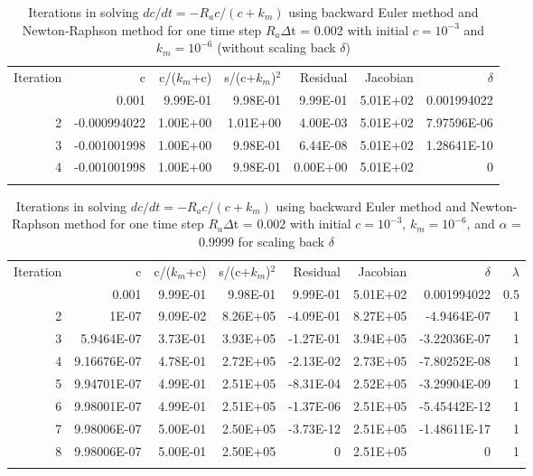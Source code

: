 \documentclass[gmd, manuscript]{copernicus}
\begin{document}
\begin{table}[t]
\caption{Iterations in solving $dc/dt=-R_ac/(c+k_m)$ using backward Euler method
and Newton-Raphson method for one time step $R_a\Delta$t = 0.002 with
initial $c=10^{-3}$ and $k_m=10^{-6}$ (without scaling back $\delta$)}
\label{table2}
\begin{tabular}{rrrrrrr}
\tophline
Iteration& c &	c/($k_m$+c)& s/(c+$k_m$)$^2$ & Residual	& Jacobian & $\delta$ \\
\middlehline
1 & 0.001 & 9.99E-01 & 9.98E-01 & 9.99E-01 & 5.01E+02 & 0.001994022  \\
2 & -0.000994022 & 1.00E+00 & 1.01E+00 & 4.00E-03 & 5.01E+02 & 7.97596E-06  \\
3 & -0.001001998 & 1.00E+00 & 9.98E-01 & 6.44E-08 & 5.01E+02 & 1.28641E-10  \\
4 & -0.001001998 & 1.00E+00 & 9.98E-01 & 0.00E+00 & 5.01E+02 & 0  \\
\bottomhline
\end{tabular}
\end{table}

\begin{table}[t]
\caption{Iterations in solving $dc/dt=-R_ac/(c+k_m)$ using backward Euler method
and Newton-Raphson method for one time step $R_a\Delta$t = 0.002 with
initial $c=10^{-3}$, $k_m=10^{-6}$, and $\alpha$ = 0.9999 for scaling back $\delta$}
\label{table3}
\begin{tabular}{rrrrrrrr}
\tophline
Iteration& c &	c/($k_m$+c)& s/(c+$k_m$)$^2$ & Residual	& Jacobian & $\delta$ & $\lambda$ \\
\middlehline
1 & 0.001 & 9.99E-01 & 9.98E-01 & 9.99E-01 & 5.01E+02 &	0.001994022 & 0.5 \\
2 & 1E-07 & 9.09E-02 & 8.26E+05 & -4.09E-01 & 8.27E+05 	& -4.9464E-07 &	1 \\
3 & 5.9464E-07 & 3.73E-01 & 3.93E+05 &	-1.27E-01 & 3.94E+05 & -3.22036E-07 & 1 \\
4 & 9.16676E-07 & 4.78E-01 & 2.72E+05 &	-2.13E-02 & 2.73E+05 & -7.80252E-08 & 1 \\
5 & 9.94701E-07	& 4.99E-01 & 2.51E+05 &	-8.31E-04 & 2.52E+05 & -3.29904E-09 & 1 \\
6 & 9.98001E-07	& 4.99E-01 & 2.51E+05 &	-1.37E-06 & 2.51E+05 & -5.45442E-12 & 1 \\
7 & 9.98006E-07	& 5.00E-01 & 2.50E+05 &	-3.73E-12 & 2.51E+05 & -1.48611E-17 & 1 \\
8 & 9.98006E-07	& 5.00E-01 & 2.50E+05 &	0 & 2.51E+05 & 0 & 1\\
\bottomhline
\end{tabular}
\end{table}
\end{document}
